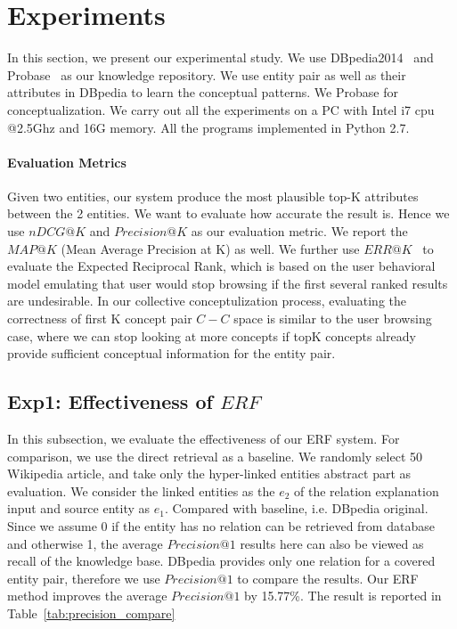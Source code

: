 
\section{Experiments}
\label{sec:exp}

In this section, we present our experimental study.
We use DBpedia2014~\cite{dbpedia} and Probase~\cite{wu2012probase} as our knowledge repository.
We use entity pair as well as their attributes in DBpedia to learn the conceptual patterns.
We Probase for conceptualization. We carry out all the experiments on a PC with Intel i7 cpu @2.5Ghz and 16G memory.
All the programs implemented in Python 2.7.

\paragraph*{Evaluation Metrics}
Given two entities, our system produce the most plausible top-K attributes between the 2 entities.
We want to evaluate how accurate the result is. 
Hence we use $nDCG@K$ and $Precision@K$ as our evaluation metric.
We report the $MAP@K$ (Mean Average Precision at K) as well.
We further use $ ERR@K$~\cite{chapelle2009expected} to evaluate the Expected Reciprocal Rank, which is based on the user behavioral model emulating that user would stop browsing if the first several ranked results are undesirable.
In our collective conceptulization process, evaluating the correctness of first K concept pair $C-C$ space is similar to the user browsing case, where we can stop looking at more concepts if topK concepts already provide sufficient conceptual information for the entity pair.


\subsection{Exp1: Effectiveness of $ERF$}
In this subsection, we evaluate the effectiveness of our ERF system.
For comparison, we use the direct retrieval as a baseline.
We randomly select 50 Wikipedia article, and take only the hyper-linked entities abstract part as evaluation.
We consider the linked entities as the $e_2$ of the relation explanation input and source entity as $e_1$.
Compared with baseline, i.e. DBpedia original.
Since we assume 0 if the entity has no relation can be retrieved from database and otherwise 1, the average $Precision@1$ results here can also be viewed as \ac{recall} of the knowledge base.
DBpedia provides only one relation for a covered entity pair, therefore we use $Precision@1$ to compare the results.
Our ERF method improves the average $Precision@1$ by 15.77\%.
The result is reported in Table~\ref{tab:precision_compare}

